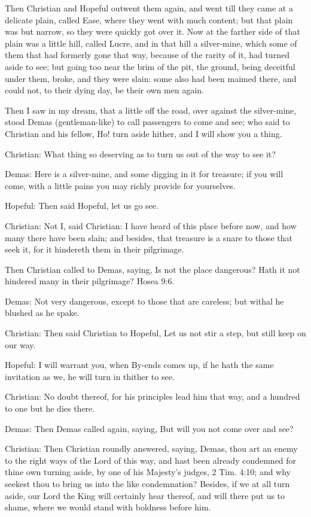 Then Christian and Hopeful outwent them again, and went till they came at a delicate plain, called Ease, where they went with much content; but that plain was but narrow, so they were quickly got over it. Now at the farther side of that plain was a little hill, called Lucre, and in that hill a silver-mine, which some of them that had formerly gone that way, because of the rarity of it, had turned aside to see; but going too near the brim of the pit, the ground, being deceitful under them, broke, and they were slain: some also had been maimed there, and could not, to their dying day, be their own men again.

Then I saw in my dream, that a little off the road, over against the silver-mine, stood Demas (gentleman-like) to call passengers to come and see; who said to Christian and his fellow, Ho! turn aside hither, and I will show you a thing.

Christian: What thing so deserving as to turn us out of the way to see it?

Demas: Here is a silver-mine, and some digging in it for treasure; if you will come, with a little pains you may richly provide for yourselves.

Hopeful: Then said Hopeful, let us go see.

Christian: Not I, said Christian: I have heard of this place before now, and how many there have been slain; and besides, that treasure is a snare to those that seek it, for it hindereth them in their pilgrimage.

Then Christian called to Demas, saying, Is not the place dangerous? Hath it not hindered many in their pilgrimage? Hosea 9:6.

Demas: Not very dangerous, except to those that are careless; but withal he blushed as he spake.

Christian: Then said Christian to Hopeful, Let us not stir a step, but still keep on our way.

Hopeful: I will warrant you, when By-ends comes up, if he hath the same invitation as we, he will turn in thither to see.

Christian: No doubt thereof, for his principles lead him that way, and a hundred to one but he dies there.

Demas: Then Demas called again, saying, But will you not come over and see?

Christian: Then Christian roundly answered, saying, Demas, thou art an enemy to the right ways of the Lord of this way, and hast been already condemned for thine own turning aside, by one of his Majesty's judges, 2 Tim. 4:10; and why seekest thou to bring us into the like condemnation? Besides, if we at all turn aside, our Lord the King will certainly hear thereof, and will there put us to shame, where we would stand with boldness before him.

